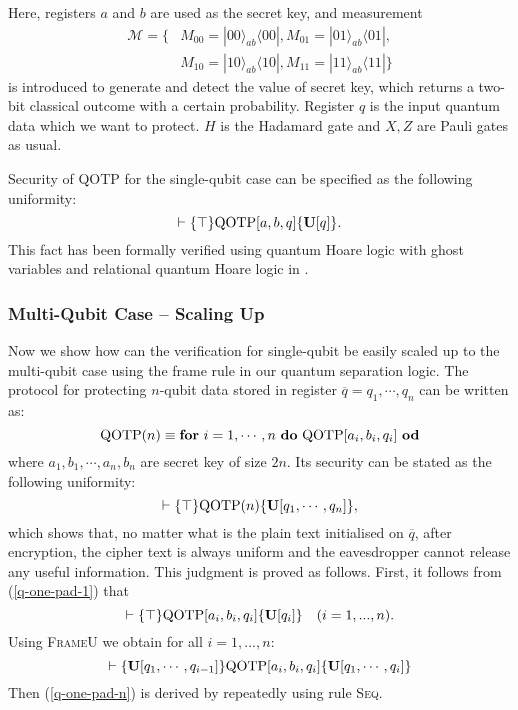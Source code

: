\documentclass[conference,compsoc, 10pt]{IEEEtran}
\newcommand{\jh}[1]{\textit{\color{red}[JH] : #1}}
\newcommand{\lz}[1]{\textit{\color{blue}[LZ] : #1}}
\newcommand {\qbar} {{\overline{q}}}
\newcommand {\cM } {{\mathcal{M}}}
\newcommand {\unia } {{\mathbf{U}}}
\def\>{\ensuremath{\rangle}}
\def\<{\ensuremath{\langle}}
\begin{document}
	\noindent Here, registers $a$ and $b$ are used as the secret key, and measurement 
    \begin{align*}
        \cM = \{&M_{00} = |00\>_{ab}\<00|, M_{01} = |01\>_{ab}\<01|, \\
	            &M_{10} = |10\>_{ab}\<10|, M_{11} = |11\>_{ab}\<11|\}
    \end{align*}
	is introduced to generate and detect the value of secret key, which returns a two-bit classical outcome with a certain probability. Register $q$ is the input quantum data which we want to protect. $H$ is the Hadamard gate and $X,Z$ are Pauli gates as usual. 
	
	Security of QOTP for the single-qubit case can be specified as the following uniformity: 
	\begin{equation}\vdash\label{q-one-pad-1}\{\top\}{\rm QOTP}[a,b,q]\{\unia[q]\}.\end{equation}
	This fact has been formally verified using quantum Hoare logic with ghost variables \cite{Unr19b} and relational quantum Hoare logic in \cite{BHY19}. 
	
	\subsubsection{Multi-Qubit Case -- Scaling Up} Now we show how can the verification for single-qubit be easily scaled up to the multi-qubit case using the frame rule in our quantum separation logic.  
	The protocol for protecting $n$-qubit data stored in register $\qbar = q_1,\cdots,q_n$ can be written as:
	$${\rm QOTP}(n)\equiv {\bf for}\ i=1,\cdots, n\ {\bf do}\ {\rm QOTP}[a_i,b_i,q_i]\ {\bf od}$$
	where $a_1,b_1,\cdots,a_n,b_n$ are secret key of size $2n$. Its security can be stated as the following uniformity:
	\begin{equation}\vdash\label{q-one-pad-n}\{\top\}{\rm QOTP}(n)\{\unia[q_1,\cdots,q_n]\},\end{equation}
	which shows that, no matter what is the plain text initialised on $\qbar$, after encryption, the cipher text is always uniform and the eavesdropper cannot release any useful information.
	This judgment is proved as follows. First, it follows from (\ref{q-one-pad-1})
  that 
  $$\vdash \{\top\}{\rm QOTP}[a_i,b_i,q_i]\{\unia[q_i]\}\quad (i=1,...,n).$$
  Using \textsc{FrameU} we obtain for all $i=1,...,n$:
	$$\vdash\{\unia[q_1,\cdots,q_{i-1}]\}{\rm QOTP}[a_i,b_i,q_i]\{\unia[q_1,\cdots,q_i]\}$$ Then (\ref{q-one-pad-n}) is derived by repeatedly using rule \textsc{Seq}. 
	
\end{document}
